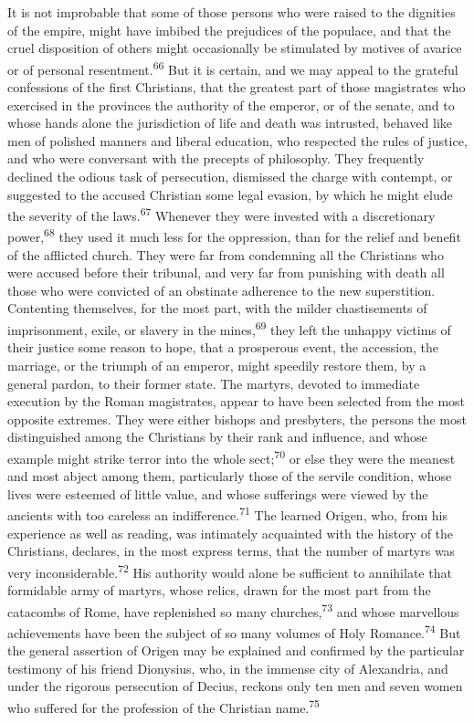 It is not improbable that some of those persons who were raised
to the dignities of the empire, might have imbibed the prejudices
of the populace, and that the cruel disposition of others might
occasionally be stimulated by motives of avarice or of personal
resentment.\textsuperscript{66} But it is certain, and we may appeal to the
grateful confessions of the first Christians, that the greatest
part of those magistrates who exercised in the provinces the
authority of the emperor, or of the senate, and to whose hands
alone the jurisdiction of life and death was intrusted, behaved
like men of polished manners and liberal education, who respected
the rules of justice, and who were conversant with the precepts
of philosophy. They frequently declined the odious task of
persecution, dismissed the charge with contempt, or suggested to
the accused Christian some legal evasion, by which he might elude
the severity of the laws.\textsuperscript{67} Whenever they were invested with a
discretionary power,\textsuperscript{68} they used it much less for the
oppression, than for the relief and benefit of the afflicted
church. They were far from condemning all the Christians who were
accused before their tribunal, and very far from punishing with
death all those who were convicted of an obstinate adherence to
the new superstition. Contenting themselves, for the most part,
with the milder chastisements of imprisonment, exile, or slavery
in the mines,\textsuperscript{69} they left the unhappy victims of their justice
some reason to hope, that a prosperous event, the accession, the
marriage, or the triumph of an emperor, might speedily restore
them, by a general pardon, to their former state. The martyrs,
devoted to immediate execution by the Roman magistrates, appear
to have been selected from the most opposite extremes. They were
either bishops and presbyters, the persons the most distinguished
among the Christians by their rank and influence, and whose
example might strike terror into the whole sect;\textsuperscript{70} or else they
were the meanest and most abject among them, particularly those
of the servile condition, whose lives were esteemed of little
value, and whose sufferings were viewed by the ancients with too
careless an indifference.\textsuperscript{71} The learned Origen, who, from his
experience as well as reading, was intimately acquainted with the
history of the Christians, declares, in the most express terms,
that the number of martyrs was very inconsiderable.\textsuperscript{72} His
authority would alone be sufficient to annihilate that formidable
army of martyrs, whose relics, drawn for the most part from the
catacombs of Rome, have replenished so many churches,\textsuperscript{73} and
whose marvellous achievements have been the subject of so many
volumes of Holy Romance.\textsuperscript{74} But the general assertion of Origen
may be explained and confirmed by the particular testimony of his
friend Dionysius, who, in the immense city of Alexandria, and
under the rigorous persecution of Decius, reckons only ten men
and seven women who suffered for the profession of the Christian
name.\textsuperscript{75}

